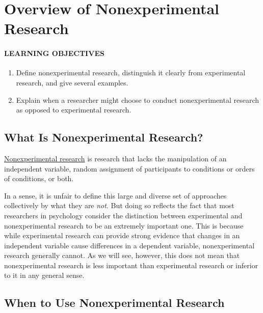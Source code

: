 \documentclass[
]{krantz}
\providecommand{\tightlist}{%
  \setlength{\itemsep}{0pt}\setlength{\parskip}{0pt}}
\begin{document}
\hypertarget{overview-of-nonexperimental-research}{%
\section{Overview of Nonexperimental Research}\label{overview-of-nonexperimental-research}}

\hypertarget{learning-objectives-23}{%
\paragraph*{LEARNING OBJECTIVES}\label{learning-objectives-23}}

\begin{enumerate}
\def\labelenumi{\arabic{enumi}.}
\tightlist
\item
  Define nonexperimental research, distinguish it clearly from experimental research, and give several examples.
\item
  Explain when a researcher might choose to conduct nonexperimental research as opposed to experimental research.
\end{enumerate}

\hypertarget{what-is-nonexperimental-research}{%
\subsection*{What Is Nonexperimental Research?}\label{what-is-nonexperimental-research}}


\protect\hyperlink{nonexperimental-research-1}{Nonexperimental research} is research that lacks the manipulation of an independent variable, random assignment of participants to conditions or orders of conditions, or both.

In a sense, it is unfair to define this large and diverse set of approaches collectively by what they are \emph{not}. But doing so reflects the fact that most researchers in psychology consider the distinction between experimental and nonexperimental research to be an extremely important one. This is because while experimental research can provide strong evidence that changes in an independent variable cause differences in a dependent variable, nonexperimental research generally cannot. As we will see, however, this does not mean that nonexperimental research is less important than experimental research or inferior to it in any general sense.

\hypertarget{when-to-use-nonexperimental-research}{%
\subsection*{When to Use Nonexperimental Research}\label{when-to-use-nonexperimental-research}}
\end{document}

